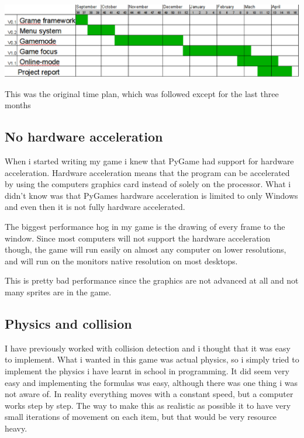 \documentclass[a4paper,12pt]{article}
\begin{document}
\includegraphics[width=\textwidth]{img/gantt.eps}

\begin{description}
        This was the original time plan, which was followed except for the last three months
\end{description}

\subsection{No hardware acceleration}

When i started writing my game i knew that PyGame had support for hardware acceleration. 
Hardware acceleration means that the program can be accelerated by using the computers graphics card instead of solely on the processor.
What i didn't know was that PyGames hardware acceleration is limited to only Windows and even then it is not fully hardware accelerated.

The biggest performance hog in my game is the drawing of every frame to the window.
Since most computers will not support the hardware acceleration though, the game will run easily on almost any computer on lower resolutions, and will run on the monitors native resolution on most desktops.

This is pretty bad performance since the graphics are not advanced at all and not many sprites are in the game.


\subsection{Physics and collision}

I have previously worked with collision detection and i thought that it was easy to implement.
What i wanted in this game was actual physics, so i simply tried to implement the physics i have learnt in school in programming.
It did seem very easy and implementing the formulas was easy, although there was one thing i was not aware of.
In reality everything moves with a constant speed, but a computer works step by step.
The way to make this as realistic as possible it to have very small iterations of movement on each item, but that would be very resource heavy.
\end{document}
